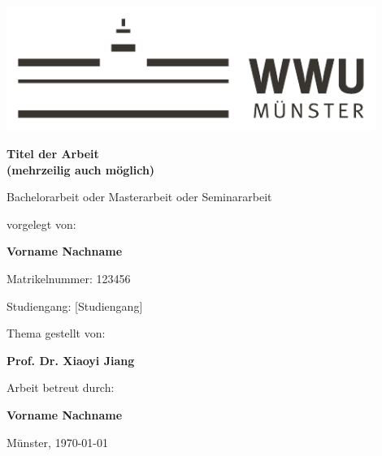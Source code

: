 \begin{centering}
\vspace*{\fill}
\includegraphics[width=12cm]{./img/wwu-logo-neu.pdf}

\vspace{2cm} 

{\LARGE
	\textbf{Titel der Arbeit\\
			(mehrzeilig auch möglich)}\\[1.2cm]
}

{\large
	Bachelorarbeit oder Masterarbeit oder Seminararbeit\\[2cm]
}

{\large
	vorgelegt von:
}

{ \Large
	\textbf{Vorname Nachname}\\[1cm]
}

{\large
	Matrikelnummer: 123456\\[2mm]
}

{\large
	Studiengang: [Studiengang]\\[1cm]
}
    
{\large
	Thema gestellt von:
}

{\Large
	\textbf{Prof. Dr. Xiaoyi Jiang}\\[1cm]
}
                               
{\large
	Arbeit betreut durch:
}

{\Large
	\textbf{Vorname Nachname}\\[1cm]
}

{\large
Münster, \today
}
\vfill
\end{centering}